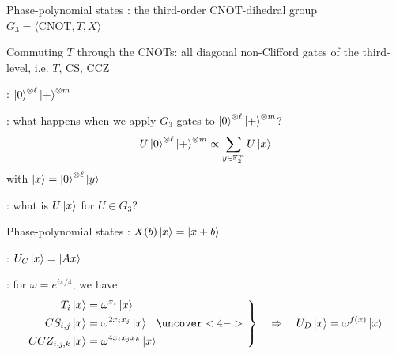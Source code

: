 \documentclass[aspectratio=169,11pt,t]{beamer}
\begin{document}
\outlineslide


\begin{frame}{Phase-polynomial states}
    : the third-order CNOT-dihedral group
    $G_3=\langle \text{CNOT}, T, X \rangle$

    \pause
    Commuting $T$ through the CNOTs: all diagonal non-Clifford gates of the third-level, i.e. $T$, $\text{CS}$, $\text{CCZ}$

    \pause
    : $\ket{0}^{\otimes \ell} \ket{+}^{\otimes m}$

    \pause
    : what happens when we apply $G_3$ gates to $\ket{0}^{\otimes \ell} \ket{+}^{\otimes m}$?
    $$
    U\ket{0}^{\otimes \ell} \ket{+}^{\otimes m} \propto \sum_{y\in \mathbb{F}_2^m} U \ket{x}
    $$
    with $\ket{x}= \ket{0}^{\otimes \ell} \ket{y}$

    \pause
    : what is $U \ket{x}$ for $U \in G_3$?
\end{frame}

\begin{frame}{Phase-polynomial states}
  :
  $X(b)\ket{x}=\ket{x+b}$

  \pause
  :
  $U_C\ket{x}=\ket{Ax}$

  \pause
  : for $\omega=e^{i\pi/4}$, we have
  \newcommand{\diagonalGateActions}{%
    \begin{aligned}
      T_i\ket{x}&=\omega^{x_i}\ket{x} \\
      CS_{i,j}\ket{x}&=\omega^{2 x_i x_j}\ket{x} \\
      CCZ_{i,j,k}\ket{x}&=\omega^{4 x_i x_j x_k}\ket{x}
    \end{aligned}%
  }
  \[
    \diagonalGateActions
    \uncover<4->{%
      \left.\vphantom{\diagonalGateActions}\right\}
      \quad\Rightarrow\quad U_D\ket{x}=\omega^{f(x)}\ket{x}%
    }
  \]
\end{frame}
\end{document}
